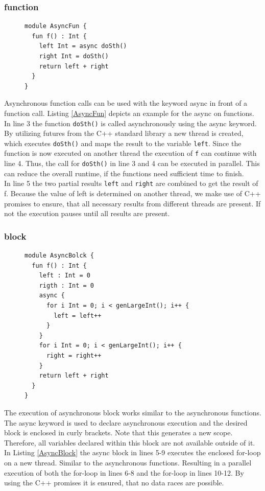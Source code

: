 \subsubsection{function}
\begin{figure}[h]
\begin{lstlisting}[caption={Example for the async feature on functions.},label={AsyncFun}]
module AsyncFun {
  fun f() : Int {
    left Int = async doSth()
    right Int = doSth()
    return left + right 
  }
}

\end{lstlisting}
\end{figure}
Asynchronous function calls can be used with the keyword async in front of a function call. Listing \ref{AsyncFun} depicts an example for the async on functions. In line 3 the function \texttt{doSth()} is called asynchronously using the async keyword. By utilizing futures from the C++ standard library a new thread is created, which executes \texttt{doSth()} and maps the result to the variable \texttt{left}. Since the function is now executed on another thread the execution of \texttt{f} can continue with line 4. Thus, the call for \texttt{doSth()} in line 3 and 4 can be executed in parallel. This can reduce the overall runtime, if the functions need sufficient time to finish.\\
In line 5 the two partial results \texttt{left} and \texttt{right} are combined to get the result of f. Because the value of left is determined on another thread, we make use of C++ promises to ensure, that all necessary results from different threads are present. If not the execution pauses until all results are present.\\
\subsubsection{block}
\begin{figure}[h]
\begin{lstlisting}[caption={Example for the async feature on a set of statements (block).},label={AsyncBlock}]
module AsyncBolck {
  fun f() : Int {
    left : Int = 0
    rigth : Int = 0
    async { 
      for i Int = 0; i < genLargeInt(); i++ {
        left = left++ 
      }
    }
    for i Int = 0; i < genLargeInt(); i++ {
      right = right++ 
    }
    return left + right 
  }
}
\end{lstlisting}
\end{figure}
The execution of asynchronous block works similar to the asynchronous functions. The async keyword is used to declare asynchronous execution and the desired block is enclosed in curly brackets. Note that this generates a new scope. Therefore, all variables declared within this block are not available outside of it.\\
In Listing \ref{AsyncBlock} the async block in lines 5-9 executes the enclosed for-loop on a new thread. Similar to the asynchronous functions. Resulting in a parallel execution of both the for-loop in lines 6-8 and the for-loop in lines 10-12. By using the C++ promises it is ensured, that no data races are possible.
